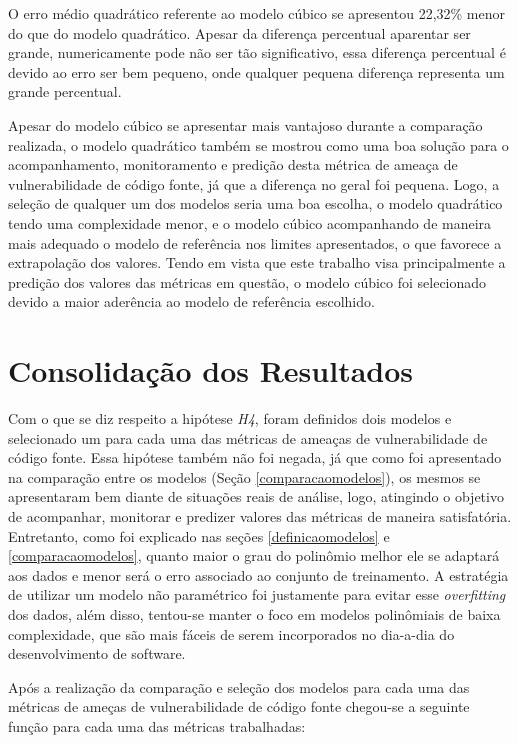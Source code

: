 O erro médio quadrático referente ao modelo cúbico se apresentou 22,32\% menor
do que do modelo quadrático. Apesar da diferença percentual aparentar ser
grande, numericamente pode não ser tão significativo, essa diferença percentual
é devido ao erro ser bem pequeno, onde qualquer pequena diferença representa um
grande percentual.

Apesar do modelo cúbico se apresentar mais vantajoso durante a comparação
realizada, o modelo quadrático também se mostrou como uma boa solução para o
acompanhamento, monitoramento e predição desta métrica de ameaça de
vulnerabilidade de código fonte, já que a diferença no geral foi pequena. Logo,
a seleção de qualquer um dos modelos seria uma boa escolha, o modelo quadrático
tendo uma complexidade menor, e o modelo cúbico acompanhando de maneira
mais adequado o modelo de referência nos limites apresentados, o que favorece a
extrapolação dos valores. Tendo em vista que este trabalho visa principalmente
a predição dos valores das métricas em questão, o modelo cúbico foi selecionado
devido a maior aderência ao modelo de referência escolhido.


\section{Consolidação dos Resultados}

Com o que se diz respeito a hipótese \textit{H4}, foram definidos dois modelos e
selecionado um para cada uma das métricas de ameaças de vulnerabilidade de
código fonte. Essa hipótese também não foi negada, já que como foi apresentado
na comparação entre os modelos (Seção \ref{comparacaomodelos}), os mesmos se
apresentaram bem diante de situações reais de análise, logo, atingindo o
objetivo de acompanhar, monitorar e predizer valores das métricas de maneira
satisfatória. Entretanto, como foi explicado nas seções \ref{definicaomodelos} e
\ref{comparacaomodelos}, quanto maior o grau do polinômio melhor ele se adaptará
aos dados e menor será o erro associado ao conjunto de treinamento. A estratégia
de utilizar um modelo não paramétrico foi justamente para evitar esse
\textit{overfitting} dos dados, além disso, tentou-se manter o foco em modelos
polinômiais de baixa complexidade, que são mais fáceis de serem incorporados no
dia-a-dia do desenvolvimento de software.

Após a realização da comparação e seleção dos modelos para cada uma das métricas
de ameças de vulnerabilidade de código fonte chegou-se a seguinte função para
cada uma das métricas trabalhadas:

